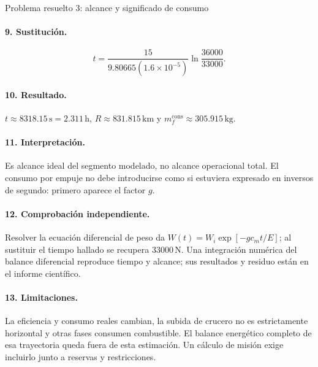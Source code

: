\begin{studiumworked}{Problema resuelto 3: alcance y significado de consumo}
\paragraph{9. Sustitución.}
\[
 t=\frac{15}{9.80665(1.6\times10^{-5})}\ln\frac{36000}{33000}.
\]
\paragraph{10. Resultado.} $t\approx8318.15\,\mathrm s=2.311\,\mathrm h$, $R\approx831.815\,\mathrm{km}$ y $m_f^{\mathrm{cons}}\approx305.915\,\mathrm{kg}$.
\paragraph{11. Interpretación.} Es alcance ideal del segmento modelado, no alcance operacional total. El consumo por empuje no debe introducirse como si estuviera expresado en inversos de segundo: primero aparece el factor $g$.
\paragraph{12. Comprobación independiente.} Resolver la ecuación diferencial de peso da $W(t)=W_i\exp[-gc_mt/E]$; al sustituir el tiempo hallado se recupera $33000\,\mathrm N$. Una integración numérica del balance diferencial reproduce tiempo y alcance; sus resultados y residuo están en el informe científico.
\paragraph{13. Limitaciones.} La eficiencia y consumo reales cambian, la subida de crucero no es estrictamente horizontal y otras fases consumen combustible. El balance energético completo de esa trayectoria queda fuera de esta estimación. Un cálculo de misión exige incluirlo junto a reservas y restricciones.


\end{studiumworked}

